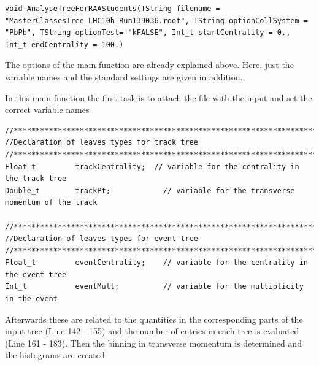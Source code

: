 \documentclass{article}
\begin{document}
\begin{lstlisting}[]
 	void AnalyseTreeForRAAStudents(TString filename = "MasterClassesTree_LHC10h_Run139036.root", TString optionCollSystem = "PbPb", TString optionTest= "kFALSE", Int_t startCentrality = 0., Int_t endCentrality = 100.)
\end{lstlisting}

The options of the main function are already explained above. Here, just the 
variable names and the standard settings are given in addition.

In this main function the first task is to attach the file with the input and 
set the correct variable names

\begin{lstlisting}[firstnumber=130]
//*********************************************************************************
//Declaration of leaves types for track tree 
//*********************************************************************************
Float_t         trackCentrality;  // variable for the centrality in the track tree
Double_t        trackPt;			// variable for the transverse momentum of the track

//*********************************************************************************
//Declaration of leaves types for event tree
//*********************************************************************************
Float_t         eventCentrality;	// variable for the centrality in the event tree
Int_t           eventMult;			// variable for the multiplicity in the event
\end{lstlisting}

Afterwards these are related to the quantities in the corresponding parts of 
the input tree (Line 142 - 155) and the number of entries in each tree is 
evaluated (Line 161 - 183). Then the binning in transverse momentum is 
determined and the histograms are created.
\end{document}
